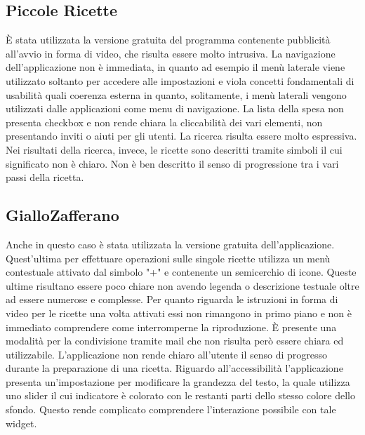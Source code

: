 \subsection{Piccole Ricette}
È stata utilizzata la versione gratuita del programma contenente pubblicità
all'avvio in forma di video, che risulta essere molto intrusiva.  La navigazione
dell'applicazione non è immediata, in quanto ad esempio il menù laterale viene
utilizzato soltanto per accedere alle impostazioni e viola concetti fondamentali
di usabilità quali coerenza esterna in quanto, solitamente,
i menù laterali vengono utilizzati dalle applicazioni come menu di navigazione.
La lista della spesa non presenta checkbox e non rende chiara la cliccabilità
dei vari elementi, non presentando inviti o aiuti per gli utenti.  La ricerca
risulta essere molto espressiva.  Nei risultati della ricerca, invece, le
ricette sono descritti tramite simboli il cui significato non è chiaro.
Non è ben descritto il senso di progressione tra i vari passi della ricetta.

\subsection{GialloZafferano}
Anche in questo caso è stata utilizzata la versione gratuita dell'applicazione.
Quest'ultima per effettuare operazioni sulle singole ricette utilizza un menù
contestuale attivato dal simbolo "+" e contenente un semicerchio di icone.
Queste ultime risultano essere poco chiare non avendo legenda o descrizione
testuale oltre ad essere numerose e complesse.  Per quanto riguarda le
istruzioni in forma di video per le ricette una volta attivati essi non
rimangono in primo piano e non è immediato comprendere come interromperne la
riproduzione.  È presente una modalità per la condivisione tramite mail che non
risulta però essere chiara ed utilizzabile.  L'applicazione non rende chiaro
all'utente il senso di progresso durante la preparazione di una ricetta.
Riguardo all'accessibilità l'applicazione presenta un'impostazione per
modificare la grandezza del testo, la quale utilizza uno slider il cui
indicatore è colorato con le restanti parti dello stesso colore dello sfondo.
Questo rende complicato comprendere l'interazione possibile con tale widget.

